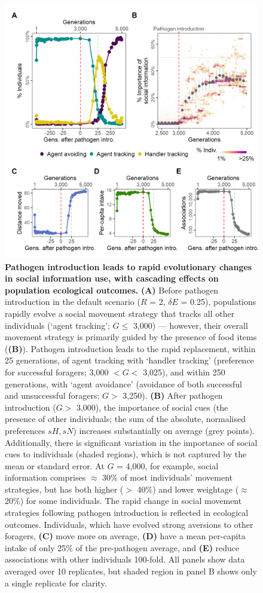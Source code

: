 \begin{figure}[!h]
    \centering
    \includegraphics[width=0.9\linewidth]{figures/pathomove/fig_01.png}
    \caption{
        \textbf{Pathogen introduction leads to rapid evolutionary changes in social information use, with cascading effects on population ecological outcomes.}
        \textbf{(A)} Before pathogen introduction in the default scenario ($R$ = 2, $\delta E$ = 0.25), populations rapidly evolve a social movement strategy that tracks all other individuals (`agent tracking'; $G \leq$ 3,000) --- however, their overall movement strategy is primarily guided by the presence of food items (\textbf{(B)}).
        Pathogen introduction leads to the rapid replacement, within 25 generations, of agent tracking with `handler tracking' (preference for successful foragers; 3,000 $< G <$ 3,025), and within 250 generations, with `agent avoidance' (avoidance of both successful and unsuccessful foragers; $G >$ 3,250).
        \textbf{(B)} After pathogen introduction ($G >$ 3,000), the importance of social cues (the presence of other individuals; the sum of the absolute, normalised preferences $sH, sN$) increases substantially on average (grey points).
        Additionally, there is significant variation in the importance of social cues to individuals (shaded regions), which is not captured by the mean or standard error.
        At $G$ = 4,000, for example, social information comprises $\approx$ 30\% of most individuals' movement strategies, but has both higher ($>$ 40\%) and lower weightage ($\approx$ 20\%) for some individuals.
        The rapid change in social movement strategies following pathogen introduction is reflected in ecological outcomes.
        Individuals, which have evolved strong aversions to other foragers, \textbf{(C)} move more on average, \textbf{(D)} have a mean per-capita intake of only 25\% of the pre-pathogen average, and \textbf{(E)} reduce associations with other individuals 100-fold.
        All panels show data averaged over 10 replicates, but shaded region in panel B shows only a single replicate for clarity.
    }
    \label{patho_fig_01}
\end{figure}

